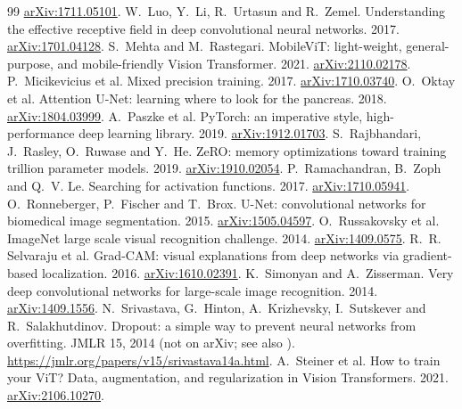 \documentclass[11pt,a4paper]{article}
\begin{document}
\begin{thebibliography}{99}
  \href{https://arxiv.org/abs/1711.05101}{arXiv:1711.05101}.
 W.~Luo, Y.~Li, R.~Urtasun and R.~Zemel. Understanding the effective receptive field in deep convolutional neural
  networks. 2017. \href{https://arxiv.org/abs/1701.04128}{arXiv:1701.04128}.
 S.~Mehta and M.~Rastegari. MobileViT: light-weight, general-purpose, and mobile-friendly Vision
  Transformer. 2021. \href{https://arxiv.org/abs/2110.02178}{arXiv:2110.02178}.
 P.~Micikevicius et al. Mixed precision training. 2017.
  \href{https://arxiv.org/abs/1710.03740}{arXiv:1710.03740}.
 O.~Oktay et al. Attention U-Net: learning where to look for the pancreas. 2018.
  \href{https://arxiv.org/abs/1804.03999}{arXiv:1804.03999}.
 A.~Paszke et al. PyTorch: an imperative style, high-performance deep learning library. 2019.
  \href{https://arxiv.org/abs/1912.01703}{arXiv:1912.01703}.
 S.~Rajbhandari, J.~Rasley, O.~Ruwase and Y.~He. ZeRO: memory optimizations toward training trillion
  parameter models. 2019. \href{https://arxiv.org/abs/1910.02054}{arXiv:1910.02054}.
 P.~Ramachandran, B.~Zoph and Q.~V. Le. Searching for activation functions. 2017.
  \href{https://arxiv.org/abs/1710.05941}{arXiv:1710.05941}.
 O.~Ronneberger, P.~Fischer and T.~Brox. U-Net: convolutional networks for biomedical image segmentation.
  2015. \href{https://arxiv.org/abs/1505.04597}{arXiv:1505.04597}.
 O.~Russakovsky et al. ImageNet large scale visual recognition challenge. 2014.
  \href{https://arxiv.org/abs/1409.0575}{arXiv:1409.0575}.
 R.~R. Selvaraju et al. Grad-CAM: visual explanations from deep networks via gradient-based localization.
  2016. \href{https://arxiv.org/abs/1610.02391}{arXiv:1610.02391}.
 K.~Simonyan and A.~Zisserman. Very deep convolutional networks for large-scale image recognition. 2014.
  \href{https://arxiv.org/abs/1409.1556}{arXiv:1409.1556}.
 N.~Srivastava, G.~Hinton, A.~Krizhevsky, I.~Sutskever and R.~Salakhutdinov. Dropout: a simple way to
  prevent neural networks from overfitting. JMLR 15, 2014 (not on arXiv; see also \cite{hinton2012dropout}).
  \url{https://jmlr.org/papers/v15/srivastava14a.html}.
 A.~Steiner et al. How to train your ViT? Data, augmentation, and regularization in Vision Transformers.
  2021. \href{https://arxiv.org/abs/2106.10270}{arXiv:2106.10270}.

\end{thebibliography}
\end{document}
